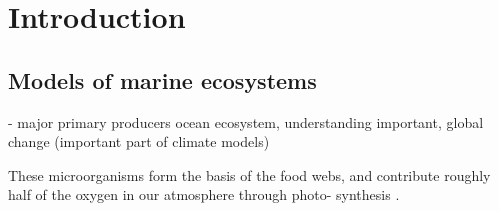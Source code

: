 \documentclass[journal abbreviation, manuscript]{copernicus}
\begin{document}
\begin{abstract} [Just collecting ideas:]





\end{abstract}



\section{Introduction}




\subsection{Models of marine ecosystems}
- major primary producers ocean ecosystem, understanding important, global change (important part of climate models)

These microorganisms form the basis of the food webs, and contribute roughly half of the oxygen in our atmosphere through photo- synthesis \citep{Field2009}.
\end{document}
